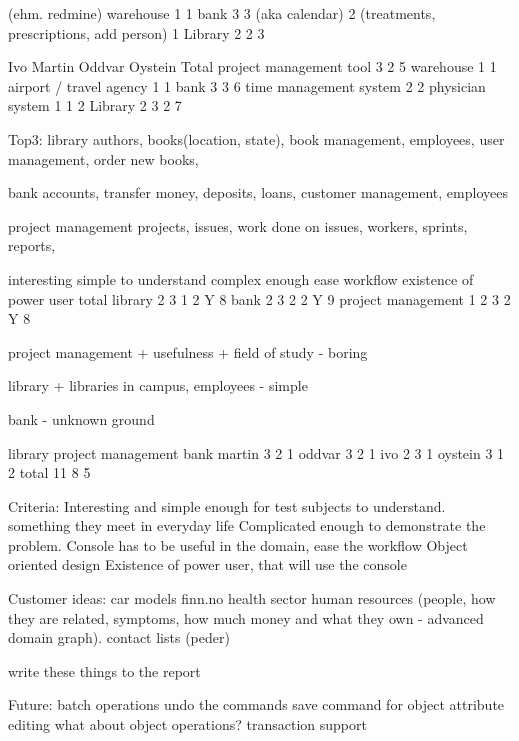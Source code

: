 (ehm. redmine) 
warehouse 1
1
bank 3 3
(aka calendar) 2
(treatments, prescriptions, add person) 1
Library 2 2 3

Ivo	Martin	Oddvar	Oystein	Total
project management tool	3		2		5
warehouse			1		1
airport / travel agency		1			1
bank		3		3	6
time management system	2				2
physician system	1			1	2
Library		2	3	2	7




Top3:
library
authors, books(location, state), book management, employees, user management, order new books, 

bank
accounts, transfer money, deposits, loans, customer management, employees

project management
projects, issues, work done on issues, workers, sprints, reports, 

interesting	simple to understand	complex enough	ease workflow	existence of power user	total
library	2	3	1	2	Y	8
bank	2	3	2	2	Y	9
project management	1	2	3	2	Y	8



project management
+ usefulness
+ field of study
- boring

library
+ libraries in campus, employees
- simple

bank
- unknown ground


library	project management	bank
martin	3	2	1
oddvar	3	2	1
ivo	2	3	1
oystein	3	1	2
total	11	8	5



Criteria:
Interesting and simple enough for test subjects to understand. something they meet in everyday life
Complicated enough to demonstrate the problem.
Console has to be useful in the domain, ease the workflow
Object oriented design
Existence of power user, that will use the console

Customer ideas:
car models
finn.no
health sector
human resources (people, how they are related, symptoms, how much money and what they own - advanced domain graph). 
contact lists (peder)


write these things to the report


Future:
batch operations
undo the commands
save command for object attribute editing
what about object operations?
transaction support

